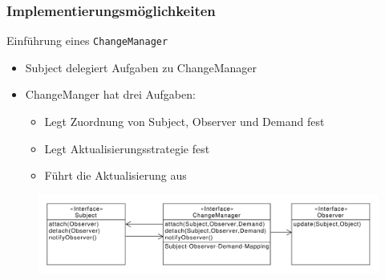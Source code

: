 \begin{frame}
\frametitle{Implementierungsmöglichkeiten}
		\begin{block}{Einführung eines \texttt{ChangeManager}}
  		 \begin{itemize}
		  	\item Subject delegiert Aufgaben zu ChangeManager
		  	\item ChangeManger hat drei Aufgaben:
		  	\begin{itemize}
		  		\item Legt Zuordnung von Subject, Observer und Demand fest
		  		\item Legt Aktualisierungsstrategie fest
		  		\item Führt die Aktualisierung aus
		  	\end{itemize}
		  \end{itemize}  
  		\end{block}		
  		\begin{figure}
		\includegraphics[scale=.4]{paper/observer/changemanager}
	\end{figure}
\end{frame}



